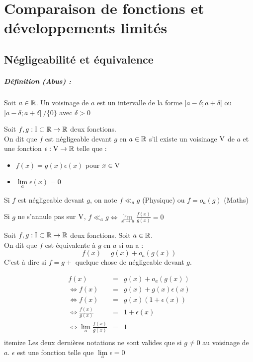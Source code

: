 \chapter{Comparaison de fonctions et développements limités}
\section{Négligeabilité  et équivalence}

\paragraph{Définition (Abus) :}
Soit $a\in\mathbb{R}$. Un voisinage de $a$ est un intervalle de la forme $]a-\delta;a+\delta[$ ou $]a-\delta;a+\delta[~/\{0\}$ avec $\delta>0$

Soit $f,g:\text{I}\subset\mathbb{R} \to \mathbb{R}$ deux fonctions.\\
On dit que $f$ est négligeable devant $g$ en $a\in\mathbb{R}$ s'il existe un voisinage $\text{V}$ de $a$ et une fonction $\epsilon:\text{V}\to\mathbb{R}$ telle que :
\begin{itemize}
	\item $f(x) = g(x)\epsilon (x)$ pour $x\in \text{V}$
	\item $\lim\limits_{a}\epsilon(x)=0$
\end{itemize}
\notation{}
Si $f$ est négligeable devant $g$, on note $f \ll_{a}g$ (Physique) ou $f=o_a(g)$ (Maths)

\remarque{}
Si $g$ ne s'annule pas sur $\text{V}$, $f \ll_a g \Leftrightarrow \lim\limits_{x\to a}\frac{f(x)}{g(x)}=0$

\exemple{}


Soit $f,g:\text{I}\subset\mathbb{R} \to \mathbb{R}$ deux fonctions. Soit $a\in\mathbb{R}$.\\
On dit que $f$ est équivalente à $g$ en $a$ si on a :
$$f(x) = g(x) + o_a(g(x))$$
C'est à dire si $f=g+$ quelque chose de négligeable devant $g$.

\remarque{}
\begin{eqnarray*}
		f(x) &=& g(x) + o_a(g(x))\\
		\Leftrightarrow f(x) & = & g(x) + g(x)\epsilon(x)\\
		\Leftrightarrow f(x) & = & g(x)(1+\epsilon(x))\\
		\Leftrightarrow \frac{f(x)}{g(x)} &=& 1 + \epsilon(x)\\
		\Leftrightarrow \lim\limits_a\frac{f(x)}{g(x)} &=& 1\\
\end{eqnarray*}itemize
Les deux dernières notations ne sont valides que si $g\neq 0$ au voisinage de $a$. $\epsilon$ est une fonction telle que $\lim\limits_a\epsilon=0$ 

